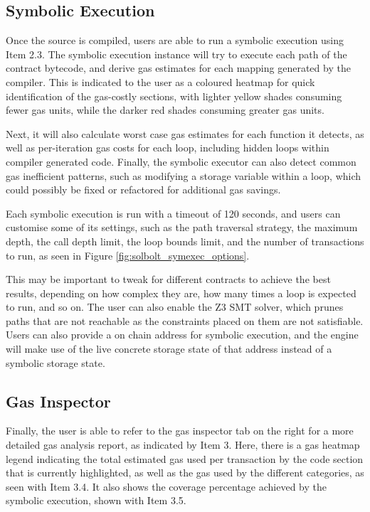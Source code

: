 \subsection{Symbolic Execution}

Once the source is compiled, users are able to run a symbolic execution using Item 2.3.
The symbolic execution instance will try to execute each path of the contract bytecode,
and derive gas estimates for each mapping generated by the compiler. This is indicated to
the user as a coloured heatmap for quick identification of the gas-costly sections, 
with lighter yellow shades consuming fewer gas units,
while the darker red shades consuming greater gas units. 

Next, it will also calculate worst case gas estimates for each function it detects, as 
well as per-iteration gas costs for
each loop, including hidden loops within compiler generated code. Finally, the
symbolic executor can also detect common gas inefficient patterns, such as modifying a 
storage variable within a loop, which could possibly be fixed or refactored for 
additional gas savings.

Each symbolic execution is run with a timeout of 120 seconds, and users can customise
some of its settings, such as the path traversal strategy, the maximum depth, 
the call depth limit, the loop bounds limit, and the number of transactions to run, 
as seen in Figure \ref{fig:solbolt_symexec_options}. 

This
may be important to tweak for different contracts to achieve the best results,
depending on how complex they are, how many times a loop is expected to run, and so on.
The user can also enable the Z3 SMT solver, which prunes paths that are not reachable as
the constraints placed on them are not satisfiable. 
Users can also provide a on chain address for symbolic execution, 
and the engine will make use of the live concrete storage state of that address instead of
a symbolic storage state.

\subsection{Gas Inspector}

Finally, the user is able to refer to the gas inspector tab on the right for a more detailed
gas analysis report, as indicated
by Item 3. Here, there is a gas heatmap legend indicating the total estimated gas used
per transaction by the code section that is currently highlighted, 
as well as the gas used by the different categories, as seen with Item 3.4.
It also shows the coverage percentage achieved by the symbolic execution, shown with Item 3.5. 

